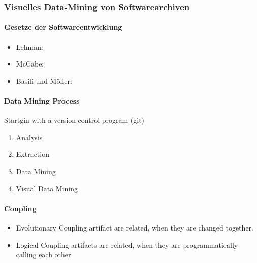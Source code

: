 \documentclass[ngerman]{scrartcl}
\begin{document}
\subsubsection{Visuelles Data-Mining von Softwarearchiven}

\paragraph{Gesetze der Softwareentwicklung}
\begin{itemize}
  \item Lehman:
  \item McCabe:
  \item Basili und Möller:
\end{itemize}

\paragraph{Data Mining Process}
Startgin with a version control program (git)
\begin{enumerate}
  \item Analysis
  \item Extraction
  \item Data Mining
  \item Visual Data Mining
\end{enumerate} 



\paragraph{Coupling}
\begin{itemize}
  \item Evolutionary Coupling artifact are related, when they are changed together.
  \item Logical Coupling artifacts are related, when they are programmatically calling each other.
\end{itemize}
\end{document}
